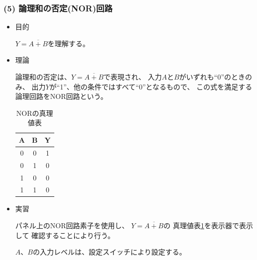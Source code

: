 \documentclass[12pt]{jarticle}
\begin{document}
\subsubsection*{(5) 論理和の否定(NOR)回路}
\begin{itemize}
    \item 目的

          $Y = \overline{A + B}$を理解する。
    \item 理論

          論理和の否定は、$Y = \overline{A + B}$で表現され、
          入力$A$と$B$がいずれも``0''のときのみ、
          出力$Y$が``1''、他の条件ではすべて``0''となるもので、
          この式を満足する論理回路をNOR回路という。

          \begin{table}[h]
              \caption{NORの真理値表}
              \begin{center}
                  \begin{tabular}{|c|c|c|}
                      \hline
                      A & B & Y \\
                      \hline
                      0 & 0 & 1 \\
                      \hline
                      0 & 1 & 0 \\
                      \hline
                      1 & 0 & 0 \\
                      \hline
                      1 & 1 & 0 \\
                      \hline
                  \end{tabular}
              \end{center}
              \label{table5}
          \end{table}
    \item 実習

          パネル上のNOR回路素子を使用し、
          $Y = \overline{A + B}$の
          真理値表\ref{table5}を表示器で表示して
          確認することにより行う。

          $A$、$B$の入力レベルは、設定スイッチにより設定する。
\end{itemize}
\end{document}
